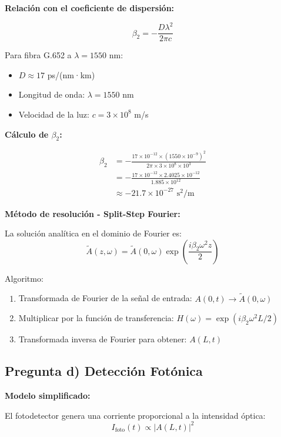 \documentclass[11pt,a4paper]{article}
\begin{document}
\textbf{Relación con el coeficiente de dispersión:}

\begin{equation}
    \beta_2 = -\frac{D\lambda^2}{2\pi c}
\end{equation}

Para fibra G.652 a $\lambda = 1550$ nm:
\begin{itemize}
    \item $D \approx 17$ ps/(nm·km)
    \item Longitud de onda: $\lambda = 1550$ nm
    \item Velocidad de la luz: $c = 3 \times 10^8$ m/s
\end{itemize}

\textbf{Cálculo de $\beta_2$:}

\begin{align}
    \beta_2 &= -\frac{17 \times 10^{-12} \times (1550 \times 10^{-9})^2}{2\pi \times 3 \times 10^8 \times 10^3} \\
    &= -\frac{17 \times 10^{-12} \times 2.4025 \times 10^{-12}}{1.885 \times 10^{12}} \\
    &\approx -21.7 \times 10^{-27} \text{ s}^2\text{/m}
\end{align}

\textbf{Método de resolución - Split-Step Fourier:}

La solución analítica en el dominio de Fourier es:
\begin{equation}
    \tilde{A}(z,\omega) = \tilde{A}(0,\omega) \exp\left(\frac{i\beta_2\omega^2z}{2}\right)
\end{equation}

Algoritmo:
\begin{enumerate}
    \item Transformada de Fourier de la señal de entrada: $A(0,t) \rightarrow \tilde{A}(0,\omega)$
    \item Multiplicar por la función de transferencia: $H(\omega) = \exp(i\beta_2\omega^2 L/2)$
    \item Transformada inversa de Fourier para obtener: $A(L,t)$
\end{enumerate}

\subsection{Pregunta d) Detección Fotónica}

\textbf{Modelo simplificado:}

El fotodetector genera una corriente proporcional a la intensidad óptica:
\begin{equation}
    I_{\text{foto}}(t) \propto |A(L,t)|^2
\end{equation}
\end{document}
